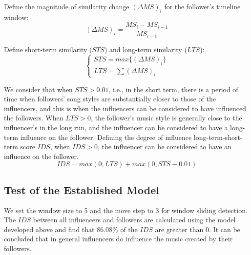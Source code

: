 \documentclass[12pt]{article}  %
\newenvironment{shrinkeq}[1]
{ \bgroup
	\addtolength\abovedisplayshortskip{#1}
	\addtolength\abovedisplayskip{#1}
	\addtolength\belowdisplayshortskip{#1}
	\addtolength\belowdisplayskip{#1}}
{\egroup\ignorespacesafterend}
\begin{document}
Define the magnitude of similarity change $(\Delta MS)_i$ for the follower's timeline window:
\begin{shrinkeq}{-1ex}
	\begin{equation}
	(\Delta MS)_i=\frac{MS_i-MS_{i-1}}{MS_{i-1}}
	\end{equation}
\end{shrinkeq}

Define short-term similarity ($STS$) and long-term similarity ($LTS$):
\begin{shrinkeq}{-1.5ex}
	\begin{equation}
	\begin{cases}
	STS=max\{(\Delta MS)_i\}\\
	LTS=\sum(\Delta MS)_i
	\end{cases}
	\end{equation}
\end{shrinkeq}

We consider that when $STS>0.01$, i.e., in the short term, there is a period of time when followers' song styles are substantially closer to those of the influencers, and this is when the influencers can be considered to have influenced the followers. When $LTS>0$, the follower's music style is generally close to the influencer's in the long run, and the influencer can be considered to have a long-term influence on the follower. Defining the degree of influence long-term-short-term score $IDS$, when $IDS>0$, the influencer can be considered to have an influence on the follower. 
\begin{shrinkeq}{-1.5ex}
	\begin{equation}\label{eq:ids}
	IDS=max(0,LTS)+max(0,STS-0.01)
	\end{equation}
\end{shrinkeq}

\subsection{Test of the Established Model}
\vspace{-0.4cm}
We set the window size to 5 and the move step to 3 for window sliding detection. The $IDS$ between all influencers and followers are calculated using the model developed above and find that 86.08\% of the $IDS$ are greater than 0. It can be concluded that in general influencers do influence the music created by their followers. 
\end{document}
